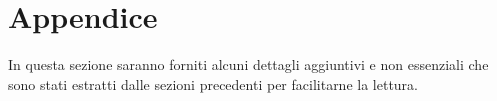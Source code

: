 \section{Appendice}
In questa sezione saranno forniti alcuni dettagli aggiuntivi e non essenziali
che sono stati estratti dalle sezioni precedenti per facilitarne 
la lettura. 



